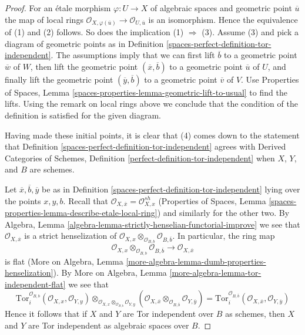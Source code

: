 \begin{proof}
For an \'etale morphism $\varphi : U \to X$ of algebraic spaces
and geometric point $\overline{u}$ the map of local rings
$\mathcal{O}_{X, \varphi(\overline{u})} \to \mathcal{O}_{U, \overline{u}}$
is an isomorphism. Hence the equivalence of (1) and (2) follows.
So does the implication (1) $\Rightarrow$ (3). Assume (3) and
pick a diagram of geometric points as in
Definition \ref{spaces-perfect-definition-tor-independent}.
The assumptions imply that we can first lift $\overline{b}$ to a geometric
point $\overline{w}$ of $W$, then lift the geometric point
$(\overline{x}, \overline{b})$ to a geometric point $\overline{u}$ of $U$,
and finally lift the geometric point
$(\overline{y}, \overline{b})$ to a geometric point $\overline{v}$ of $V$.
Use Properties of Spaces, Lemma
\ref{spaces-properties-lemma-geometric-lift-to-usual}
to find the lifts.
Using the remark on local rings above we conclude that the condition
of the definition is satisfied for the given diagram.

\medskip\noindent
Having made these initial points, it is clear that (4) comes down to the
statement that
Definition \ref{spaces-perfect-definition-tor-independent}
agrees with
Derived Categories of Schemes, Definition
\ref{perfect-definition-tor-independent}
when $X$, $Y$, and $B$ are schemes.

\medskip\noindent
Let $\overline{x}, \overline{b}, \overline{y}$ be as in
Definition \ref{spaces-perfect-definition-tor-independent} lying over the points
$x, y, b$. Recall that
$\mathcal{O}_{X, \overline{x}} = \mathcal{O}_{X, x}^{sh}$
(Properties of Spaces, Lemma
\ref{spaces-properties-lemma-describe-etale-local-ring}) and similarly
for the other two. By Algebra, Lemma
\ref{algebra-lemma-strictly-henselian-functorial-improve} we see that
$\mathcal{O}_{X, \overline{x}}$ is a strict henselization of
$\mathcal{O}_{X, x} \otimes_{\mathcal{O}_{B, b}} \mathcal{O}_{B, \overline{b}}$.
In particular, the ring map
$$
\mathcal{O}_{X, x} \otimes_{\mathcal{O}_{B, b}} \mathcal{O}_{B, \overline{b}}
\longrightarrow
\mathcal{O}_{X, \overline{x}}
$$
is flat (More on Algebra, Lemma
\ref{more-algebra-lemma-dumb-properties-henselization}). By
More on Algebra, Lemma \ref{more-algebra-lemma-tor-independent-flat}
we see that
$$
\text{Tor}_i^{\mathcal{O}_{B, b}}(\mathcal{O}_{X, x}, \mathcal{O}_{Y, y})
\otimes_{\mathcal{O}_{X, x} \otimes_{\mathcal{O}_{B, b}} \mathcal{O}_{Y, y}}
(\mathcal{O}_{X, \overline{x}} \otimes_{\mathcal{O}_{B, \overline{b}}}
\mathcal{O}_{Y, \overline y})
=
\text{Tor}_i^{\mathcal{O}_{B, \overline{b}}}(
\mathcal{O}_{X, \overline{x}}, \mathcal{O}_{Y, \overline{y}})
$$
Hence it follows that if $X$ and $Y$ are Tor independent over $B$
as schemes, then $X$ and $Y$ are Tor independent as algebraic spaces over $B$.


\end{proof}

